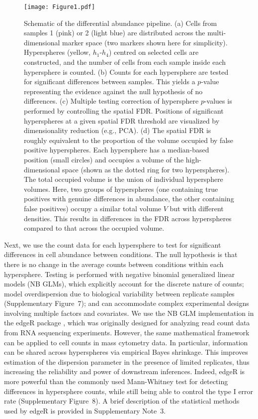 \documentclass{article}
\newcommand{\suppsecedgeR}{3}
\newcommand{\suppfignbdisp}{7}
\newcommand{\suppfigedgeR}{8}
\begin{document}
\begin{figure}[btp]
    \begin{center}
        \texttt{[image: Figure1.pdf]}
    \end{center}
    \caption{Schematic of the differential abundance pipeline.
        (a) Cells from samples 1 (pink) or 2 (light blue) are distributed across the multi-dimensional marker space (two markers shown here for simplicity).
        Hyperspheres (yellow, $h_1$-$h_4$) centred on selected cells are constructed, and the number of cells from each sample inside each hypersphere is counted.
        (b) Counts for each hypersphere are tested for significant differences between samples.
        This yields a $p$-value representing the evidence against the null hypothesis of no differences.
        (c) Multiple testing correction of hypersphere $p$-values is performed by controlling the spatial FDR.
        Positions of significant hyperspheres at a given spatial FDR threshold are visualized by dimensionality reduction (e.g., PCA).
        (d) The spatial FDR is roughly equivalent to the proportion of the volume occupied by false positive hyperspheres.
    Each hypersphere has a median-based position (small circles) and occupies a volume of the high-dimensional space (shown as the dotted ring for two hyperspheres).
    The total occupied volume is the union of individual hypersphere volumes.
    Here, two groups of hyperspheres (one containing true positives with genuine differences in abundance, the other containing false positives) occupy a similar total volume $V$ but with different densities.
This results in differences in the FDR across hyperspheres compared to that across the occupied volume.
    }
    \label{fig:overview}
\end{figure}

Next, we use the count data for each hypersphere to test for significant differences in cell abundance between conditions.
The null hypothesis is that there is no change in the average counts between conditions within each hypersphere.
Testing is performed with negative binomial generalized linear models (NB GLMs), which explicitly account for the discrete nature of counts; model overdispersion due to biological variability between replicate samples (Supplementary Figure~\suppfignbdisp{}); and can accommodate complex experimental designs involving multiple factors and covariates.
We use the NB GLM implementation in the edgeR package \cite{mccarthy2012differential}, which was originally designed for analyzing read count data from RNA sequencing experiments.
However, the same mathematical framework can be applied to cell counts in mass cytometry data.
In particular, information can be shared across hyperspheres via empirical Bayes shrinkage.
This improves estimation of the dispersion parameter in the presence of limited replicates, thus increasing the reliability and power of downstream inferences.
Indeed, edgeR is more powerful than the commonly used Mann-Whitney test for detecting differences in hypersphere counts, while still being able to control the type I error rate (Supplementary Figure~\suppfigedgeR).
A brief description of the statistical methods used by edgeR is provided in Supplementary Note~\suppsecedgeR{}.
\end{document}
